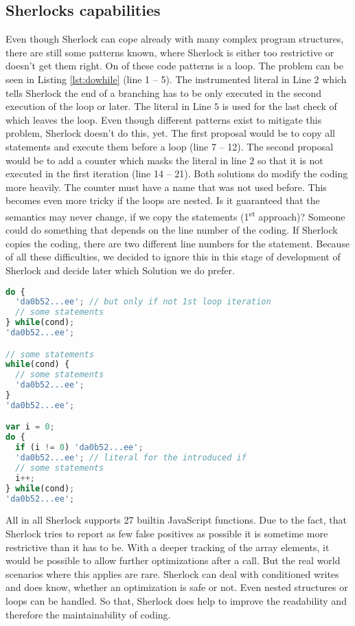 \subsection{Sherlocks capabilities}
Even though Sherlock can cope already with many complex program structures, there are still some patterns known, where Sherlock is either too restrictive or doesn't get them right. 
On of these code patterns is a  loop. The problem can be seen in Listing \ref{lst:dowhile} (line 1 -- 5). The instrumented literal in Line $2$ which tells Sherlock the end of a branching has to be only executed in the second execution of the loop or later. The literal in Line $5$ is used for the last check of  which leaves the loop. Even though different patterns exist to mitigate this problem, Sherlock doesn't do this, yet. The first proposal would be to copy all statements and execute them before a  loop (line 7 -- 12). The second proposal would be to add a counter which masks the literal in line $2$ so that it is not executed in the first iteration (line 14 -- 21). Both solutions do modify the coding more heavily. The counter must have a name that was not used before. This becomes even more tricky if the loops are nested. Is it guaranteed that the semantics may never change, if we copy the statements (1\textsuperscript{st} approach)? Someone could do something that depends on the line number of the coding. If Sherlock copies the coding, there are two different line numbers for the statement. Because of all these difficulties, we decided to ignore this in this stage of development of Sherlock and decide later which Solution we do prefer.

\begin{lstlisting}[label=lst:dowhile,caption=Listing,language=Javascript]
do {
  'da0b52...ee'; // but only if not 1st loop iteration
  // some statements
} while(cond);
'da0b52...ee';

// some statements
while(cond) {
  // some statements
  'da0b52...ee';
}
'da0b52...ee';

var i = 0;
do {
  if (i != 0) 'da0b52...ee';
  'da0b52...ee'; // literal for the introduced if 
  // some statements
  i++;
} while(cond);
'da0b52...ee';
\end{lstlisting}


All in all Sherlock supports 27 builtin JavaScript functions. Due to the fact, that Sherlock tries to report as few false positives as possible it is sometime more restrictive than it has to be. With a deeper tracking of the array elements, it would be possible to allow further optimizations after a  call. But the real world scenarios where this applies are rare. Sherlock can deal with conditioned writes and does know, whether an optimization is safe or not. Even nested structures or loops can be handled. So that, Sherlock does help to improve the readability and therefore the maintainability of coding.










